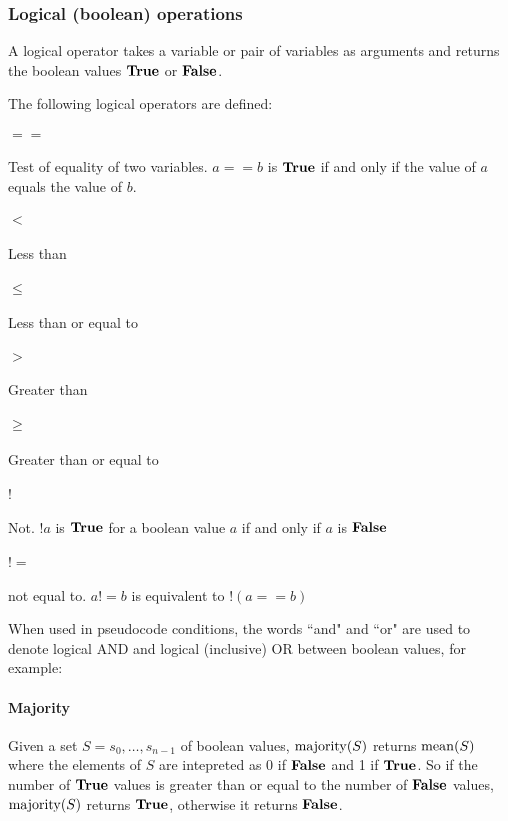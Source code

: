 \subsubsection{Logical (boolean) operations}
\label{booleanops}

A logical operator takes a variable or pair of variables as arguments and
returns the boolean values $\text{\bf{True}}$ or $\text{\bf{False}}$.

The following logical operators are defined:

\paragraph*{$==$} Test of equality of two variables. $a==b$ is $\text{\bf{True}}$ if and
only if the value of $a$ equals the value of $b$. 

\paragraph*{$<$}	Less than

\paragraph*{$\leq$} Less than or equal to

\paragraph*{$>$}	Greater than

\paragraph*{$\geq$} Greater than or equal to

\paragraph*{$!$} Not. $!a$ is $\text{\bf{True}}$ for a boolean value $a$ if and only if $a$ is $\text{\bf{False}}$

\paragraph*{$!=$} not equal to. $a!=b$ is equivalent to $!(a==b)$

When used in pseudocode conditions, the words ``and" and ``or" are used to denote logical AND
and logical (inclusive) OR between boolean values, for example:

\begin{pseudo*}
    \bsCODE{\hdots}
\bsEND
\end{pseudo*}

\paragraph*{Majority} Given a set $S=s_0, \hdots, s_{n-1}$ of boolean values, $\operatorname{majority}(S)$ 
returns $\operatorname{mean}(S)$ where the elements of $S$ are intepreted as $0$ if $\text{\bf{False}}$ and 1 if $\text{\bf{True}}$.
So if the number of $\text{\bf{True}}$ values is greater than or equal to the number of $\text{\bf{False}}$ values, $\operatorname{majority}(S)$ returns
$\text{\bf{True}}$, otherwise it returns $\text{\bf{False}}$.
